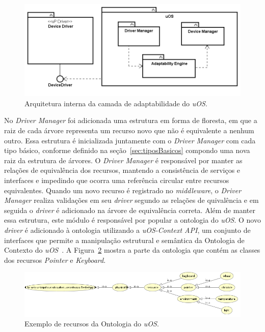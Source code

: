 \begin{figure}[ht]
	\center
	\includegraphics[scale=0.6]{imagens/diagramaDeBlocos}
	\caption{Arquitetura interna da camada de adaptabilidade do \emph{uOS}.}
	\label{fig:diagramaDeBlocos}
\end{figure}

No \emph{Driver Manager} foi adicionada uma estrutura em forma de floresta, em que a raiz de cada árvore representa um recurso novo que não é equivalente a nenhum outro. Essa estrutura é inicializada juntamente com o \emph{Driver Manager} com cada tipo básico, conforme definido na seção~\ref{sec:tiposBasicos} compondo uma nova raiz da estrutura de árvores. O \emph{Driver Manager} é responsável por manter as relações de equivalência dos recursos, mantendo a consistência de serviços e interfaces e impedindo que ocorra uma referência circular entre recursos equivalentes. Quando um novo recurso é registrado no \emph{middleware}, o \emph{Driver Manager} realiza validações em seu \emph{driver} segundo as relações de quivalência e em seguida o \emph{driver} é adicionado na árvore de equivalência correta. Além de manter essa estrutura, este módulo é responsável por popular a ontologia do \emph{uOS}. O novo \emph{driver} é adicionado à ontologia utilizando a \emph{uOS-Context API}, um conjunto de interfaces que permite a manipulação estrutural e semântica da Ontologia de Contexto do \emph{uOS}~\cite{ozakisbcup2011}. A Figura~\ref{fig:ontologiaUOS} mostra a parte da ontologia que contém as classes dos recursos \emph{Pointer} e \emph{Keyboard}.

\begin{figure}[ht]
	\center
	\includegraphics[scale=0.55]{imagens/ontologia}
	\caption{Exemplo de recursos da Ontologia do \emph{uOS}.}
	\label{fig:ontologiaUOS}
\end{figure}

